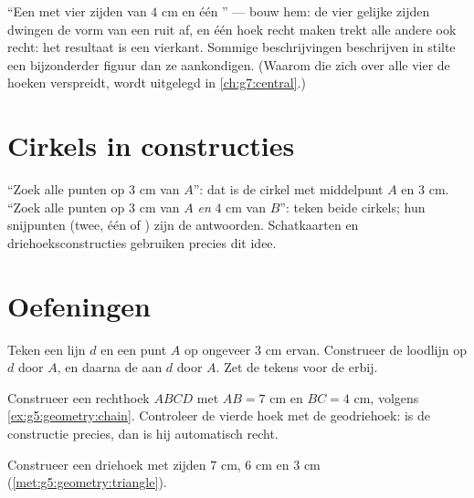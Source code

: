 \begin{example}\label{ex:g5:geometry:recognize}
``Een  met vier zijden van $4$ cm en één '' --- bouw hem:
de vier gelijke zijden dwingen de vorm van een ruit af, en één hoek recht
maken trekt alle andere ook recht: het resultaat is een vierkant. Sommige
beschrijvingen beschrijven in stilte een bijzonderder figuur dan ze
aankondigen. (Waarom die  zich over alle vier de hoeken verspreidt,
wordt uitgelegd in \cref{ch:g7:central}.)
\end{example}

\section{Cirkels in constructies}

\begin{example}\label{ex:g5:geometry:circle}
``Zoek alle punten op $3$ cm van $A$'': dat is de cirkel met middelpunt $A$
en  $3$ cm. ``Zoek alle punten op $3$ cm van $A$ \emph{en} $4$ cm van
$B$'': teken beide cirkels; hun snijpunten (twee, één of ) zijn de
antwoorden. Schatkaarten en driehoeksconstructies gebruiken precies dit idee.
\end{example}

\section{Oefeningen}

\begin{exercise}[$\star$]\label{exo:g5:geometry:1}
Teken een lijn $d$ en een punt $A$ op ongeveer $3$ cm ervan. Construeer de
loodlijn op $d$ door $A$, en daarna de  aan $d$ door $A$. Zet de
tekens voor de  erbij.
\end{exercise}

\begin{exercise}[$\star$]\label{exo:g5:geometry:2}
Construeer een rechthoek $ABCD$ met $AB = 7$ cm en $BC = 4$ cm, volgens
\cref{ex:g5:geometry:chain}. Controleer de vierde hoek met de geodriehoek: is
de constructie precies, dan is hij automatisch recht.
\end{exercise}

\begin{exercise}[$\star$]\label{exo:g5:geometry:3}
Construeer een driehoek met zijden $7$ cm, $6$ cm en $3$ cm
(\cref{met:g5:geometry:triangle}).
\end{exercise}

